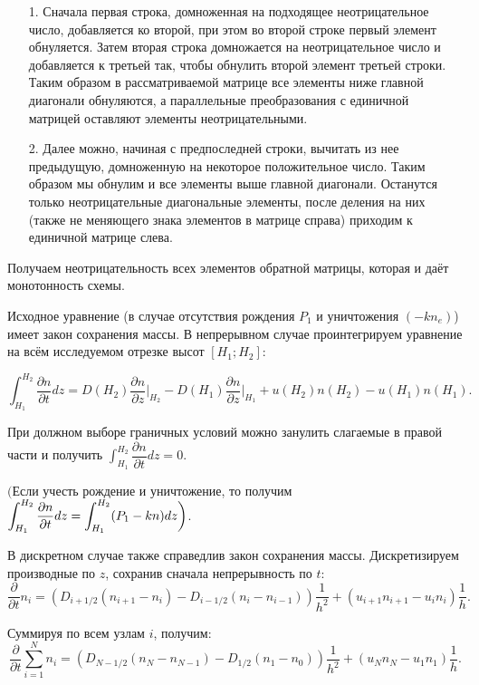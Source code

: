 \documentclass[14pt, a4paper, fleqn, twoside]{extreport}
\newcommand*{\hm}[1]{#1\nobreak\discretionary{}%
{\hbox{$\mathsurround=0pt #1$}}{}}
\def\hm#1{#1\nobreak\discretionary{}{\hbox{$#1$}}{}}
\theoremstyle{definiton}
\theoremstyle{definition}
\begin{document}
\begin{itemize}
\item[1.] Сначала первая строка, домноженная на подходящее неотрицательное число, добавляется ко второй, при этом во второй строке первый элемент обнуляется. Затем вторая строка домножается на неотрицательное число и добавляется к третьей так, чтобы обнулить второй элемент третьей строки. Таким образом в рассматриваемой матрице все элементы ниже главной диагонали обнуляются, а параллельные преобразования с единичной матрицей оставляют элементы неотрицательными.

\item[2.] Далее можно, начиная с предпоследней строки, вычитать из нее предыдущую, домноженную на некоторое положительное число. Таким образом мы обнулим и все элементы выше главной диагонали. Останутся только неотрицательные диагональные элементы, после деления на них (также не меняющего знака элементов в матрице справа) приходим к единичной матрице слева.
\end{itemize}

Получаем неотрицательность всех элементов обратной матрицы, которая и даёт монотонность схемы.
\bigskip

Исходное уравнение (в случае отсутствия рождения $P_1$ и уничтожения $(-kn_e)$) имеет закон сохранения массы. В непрерывном случае проинтегрируем уравнение на всём исследуемом отрезке высот $[H_1; H_2]$: 

$$\int_{H_1}^{H_2} \dfrac{\partial n}{\partial t} dz = D(H_2)\dfrac{\partial n}{\partial z}\bigg|_{H_2}-D(H_1)\dfrac{\partial n}{\partial z}\bigg|_{H_1}+u(H_2)n(H_2)-u(H_1)n(H_1).$$

При должном выборе граничных условий можно занулить слагаемые в правой части и получить $\displaystyle\int_{H_1}^{H_2}\dfrac{\partial n}{\partial t} dz = 0$.

$\bigg($Если учесть рождение и уничтожение, то получим $\displaystyle\int_{H_1}^{H_2}\dfrac{\partial n}{\partial t} dz \hm= \displaystyle\int_{H_1}^{H_2} (P_1-kn)dz\bigg)$.

\bigskip

В дискретном случае также справедлив закон сохранения массы. Дискретизируем производные по $z$, сохранив сначала непрерывность по $t$: $$\dfrac{\partial}{\partial t} n_i = (D_{i+1/2}(n_{i+1}-n_i)-D_{i-1/2}(n_i-n_{i-1}))\dfrac{1}{h^2}+(u_{i+1}n_{i+1}-u_i n_i)\dfrac{1}{h}.$$

Суммируя по всем узлам $i$, получим: $$\dfrac{\partial}{\partial t} \displaystyle\sum_{i=1}^{N} n_i = (D_{N-1/2}(n_{N}-n_{N-1})-D_{1/2}(n_1-n_0))\dfrac{1}{h^2}+(u_{N}n_{N}-u_1 n_1)\dfrac{1}{h}.$$
\end{document}
